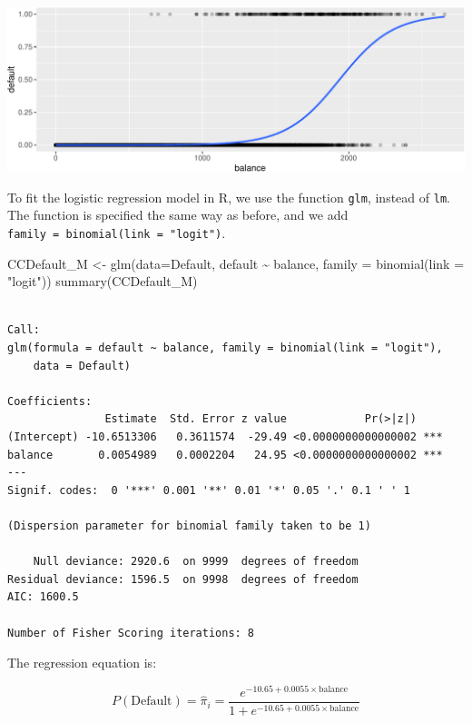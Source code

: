 \documentclass[
  letterpaper,
  DIV=11,
  numbers=noendperiod]{scrreprt}
\newenvironment{Shaded}{\begin{snugshade}}{\end{snugshade}}
\newcommand{\AttributeTok}[1]{\textcolor[rgb]{0.40,0.45,0.13}{#1}}
\newcommand{\FunctionTok}[1]{\textcolor[rgb]{0.28,0.35,0.67}{#1}}
\newcommand{\NormalTok}[1]{\textcolor[rgb]{0.00,0.23,0.31}{#1}}
\newcommand{\OtherTok}[1]{\textcolor[rgb]{0.00,0.23,0.31}{#1}}
\newcommand{\SpecialCharTok}[1]{\textcolor[rgb]{0.37,0.37,0.37}{#1}}
\newcommand{\StringTok}[1]{\textcolor[rgb]{0.13,0.47,0.30}{#1}}
\begin{document}
\includegraphics{Ch6_files/figure-pdf/unnamed-chunk-10-1.pdf}

To fit the logistic regression model in R, we use the function
\texttt{glm}, instead of \texttt{lm}. The function is specified the same
way as before, and we add
\texttt{family\ =\ binomial(link\ =\ "logit")}.

\begin{Shaded}
\begin{Highlighting}[]
\NormalTok{CCDefault\_M }\OtherTok{\textless{}{-}} \FunctionTok{glm}\NormalTok{(}\AttributeTok{data=}\NormalTok{Default, default }\SpecialCharTok{\textasciitilde{}}\NormalTok{ balance, }\AttributeTok{family =} \FunctionTok{binomial}\NormalTok{(}\AttributeTok{link =} \StringTok{"logit"}\NormalTok{))}
\FunctionTok{summary}\NormalTok{(CCDefault\_M)}
\end{Highlighting}
\end{Shaded}

\begin{verbatim}

Call:
glm(formula = default ~ balance, family = binomial(link = "logit"), 
    data = Default)

Coefficients:
               Estimate  Std. Error z value            Pr(>|z|)    
(Intercept) -10.6513306   0.3611574  -29.49 <0.0000000000000002 ***
balance       0.0054989   0.0002204   24.95 <0.0000000000000002 ***
---
Signif. codes:  0 '***' 0.001 '**' 0.01 '*' 0.05 '.' 0.1 ' ' 1

(Dispersion parameter for binomial family taken to be 1)

    Null deviance: 2920.6  on 9999  degrees of freedom
Residual deviance: 1596.5  on 9998  degrees of freedom
AIC: 1600.5

Number of Fisher Scoring iterations: 8
\end{verbatim}

The regression equation is:

\[ P(\text{Default}) = \hat{\pi}_i = \frac{e^{-10.65+0.0055\times\text{balance}}}{1+e^{-10.65+0.0055\times\text{balance}}} \]
\end{document}
